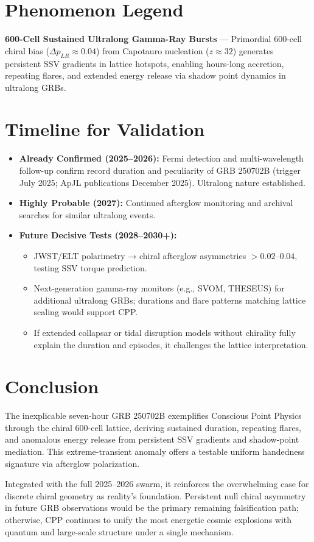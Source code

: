 \documentclass[11pt]{article}
\begin{document}
\section{Phenomenon Legend}
\textbf{600-Cell Sustained Ultralong Gamma-Ray Bursts} — Primordial 600-cell chiral bias ($\Delta p_{LR} \approx 0.04$) from Capotauro nucleation ($z \approx 32$) generates persistent SSV gradients in lattice hotspots, enabling hours-long accretion, repeating flares, and extended energy release via shadow point dynamics in ultralong GRBs.

\section{Timeline for Validation}
\begin{itemize}
    \item \textbf{Already Confirmed (2025--2026):} Fermi detection and multi-wavelength follow-up confirm record duration and peculiarity of GRB 250702B (trigger July 2025; ApJL publications December 2025). Ultralong nature established.
    \item \textbf{Highly Probable (2027):} Continued afterglow monitoring and archival searches for similar ultralong events.
    \item \textbf{Future Decisive Tests (2028--2030+):}
    \begin{itemize}
        \item JWST/ELT polarimetry → chiral afterglow asymmetries $>0.02$--$0.04$, testing SSV torque prediction.
        \item Next-generation gamma-ray monitors (e.g., SVOM, THESEUS) for additional ultralong GRBs; durations and flare patterns matching lattice scaling would support CPP.
        \item If extended collapsar or tidal disruption models without chirality fully explain the duration and episodes, it challenges the lattice interpretation.
    \end{itemize}
\end{itemize}

\section{Conclusion}
The inexplicable seven-hour GRB 250702B exemplifies Conscious Point Physics through the chiral 600-cell lattice, deriving sustained duration, repeating flares, and anomalous energy release from persistent SSV gradients and shadow-point mediation. This extreme-transient anomaly offers a testable uniform handedness signature via afterglow polarization.  

Integrated with the full 2025--2026 swarm, it reinforces the overwhelming case for discrete chiral geometry as reality's foundation. Persistent null chiral asymmetry in future GRB observations would be the primary remaining falsification path; otherwise, CPP continues to unify the most energetic cosmic explosions with quantum and large-scale structure under a single mechanism.
\end{document}
